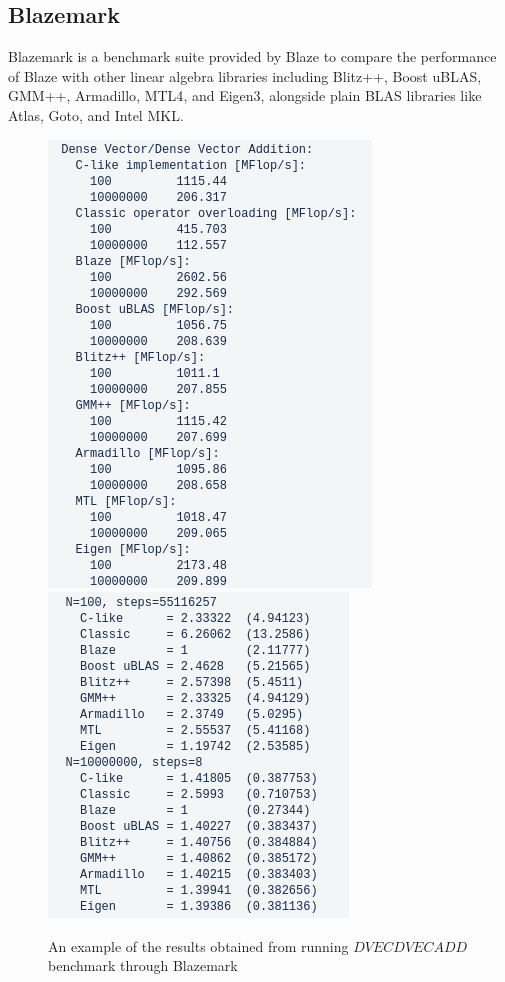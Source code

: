 \subsection{Blazemark}
Blazemark is a benchmark suite provided by Blaze to compare the performance of Blaze with other linear algebra libraries including Blitz++\cite{Blitz}, Boost uBLAS\cite{Boost}, GMM++\cite{GMM++}, Armadillo\cite{sanderson2016armadillo}, MTL4\cite{MTL}, and Eigen3\cite{Eigen}, alongside plain BLAS libraries like Atlas\cite{ATLAS}, Goto\cite{gotoblas}, and Intel MKL.\cite{MKL}

\begin{figure}[H]
	\centering
	\includegraphics[scale=0.5]{images/blazemark_1.png}
	\includegraphics[scale=0.5]{images/blazemark_2.png}
	\caption{An example of the results obtained from running $DVECDVECADD$ benchmark through Blazemark}	
	\label{blazemark1}
\end{figure}


